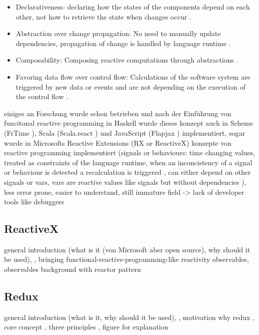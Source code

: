 \documentclass[Bachelor,BIF,english]{twbook}
\begin{document}
\begin{itemize}
\item Declarativeness: declaring how the states of the components depend on each other, not how to retrieve the state when changes occur \cite[p.~2]{PositivEffectOfRP}.
\item Abstraction over change propagation: No need to manually update dependencies, propagation of change is handled by language runtime \cite[p.~2]{PositivEffectOfRP}.
\item Composability: Composing reactive computations through abstractions \cite[p.~2]{PositivEffectOfRP}.
\item Favoring data flow over control flow: Calculations of the software system are triggered by new data or events and are not depending on the execution of the control flow \cite[p.~2]{PositivEffectOfRP}.
\end{itemize}
einiges an Forschung wurde schon betrieben und nach der Einführung von funcitonal reactive programming in Haskell wurde dieses konzept auch in Scheme (FrTime \cite{FrTime}), Scala (Scala.react \cite{DeprecatingOP}) und JavaScript (Flapjax \cite{Flapjax}) implementiert, sogar wurde in Microsofts Reactive Extensions (RX or ReactiveX) konzepte von reactive programming implementiert \cite[p.~954]{RPWalkthrough} \cite[p.~796]{DebuggingRP} \cite[p.~2]{PositivEffectOfRP}
(signals or behaviours: time changing values, treated as constraints of the language runtime, when an inconcistency of a signal or behaviour is detected a recalculation is triggered \cite[p.~797]{DebuggingRP} \cite[p.~3]{PositivEffectOfRP}, can either depend on other signals or vars, vars are reactive values like signals but without dependencies \cite[p.~2]{PositivEffectOfRP}), less error prone, easier to understand, still immature field -> lack of developer tools like debuggers \cite[p.~796]{DebuggingRP} 
\subsection{ReactiveX}
general introduction (what is it \cite{ReactiveExtensions} (von Microsoft aber open source), why should it be used), \cite{ReactiveX}, bringing functional-reactive-programming-like reactivity 
observables, observables background with reactor pattern \cite{RxObservables}
\subsection{Redux}
general introduction (what is it, why should it be used), \cite{Redux}, motivation why redux \cite{ReduxIntroMoti}, core concept \cite{ReduxIntroCC}, three principles \cite{ReduxIntro3P}, figure for explanation
\end{document}
